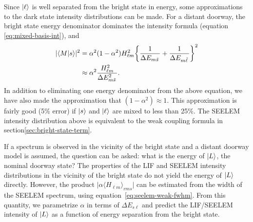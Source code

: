 Since $\mathinner{|{\ell}\rangle}$ is well separated from the bright state in energy,
some approximations to the dark state intensity distributions can be
made.  For a distant doorway, the bright state energy denominator
dominates the intensity formula (equation \ref{eq:mixed-basis-int}),
and
\begin{equation}
  \label{eq:distant-lif}
  \begin{split}
  \lvert \mathinner{\langle{M|s}\rangle} \rvert^2& = 
  \alpha^2 (1-\alpha^2) H_{\ell m}^2 
   \biggl \lbrace 
   \frac{1}{\Delta E_{m \tilde{s}\,}} +\frac{1}{\Delta E_{m \tilde{\ell}\,}}
   \biggr \rbrace^2\\
   & \approx \alpha^2 \frac{H_{\ell m}^2}{\Delta E_{m \tilde{s}\,}^2}.\\
   \end{split}
\end{equation}
In addition to eliminating one energy denominator from the above
equation, we have also made the approximation that $(1-\alpha^2)
\approx 1$.  This approximation is fairly good (5\% error) if
$\mathinner{|{s}\rangle}$ and $\mathinner{|{\ell}\rangle}$ are mixed to less than 25\%.  The SEELEM
intensity distribution above is equivalent to the weak coupling
formula in section\ref{sec:bright-state-term}.

If a spectrum is observed in the vicinity of the bright state and a
distant doorway model is assumed, the question can be asked: what is
the energy of $\mathinner{|{L}\rangle}$, the nominal doorway state?  The properties of
the LIF and SEELEM intensity distributions in the vicinity of the
bright state do not yield the energy of $\mathinner{|{L}\rangle}$ directly.  However,
the product $\lvert \alpha \langle H_{\ell m} \rangle_{rms} \rvert$
can be estimated from the width of the SEELEM spectrum, using
equation~\ref{eq:seelem-weak-fwhm}.  From this quantity, we
parametrize $\alpha$ in terms of $\Delta E_{s\ell}$ and predict the
LIF/SEELEM intensity of $\mathinner{|{L}\rangle}$ as a function of energy separation
from the bright state.

